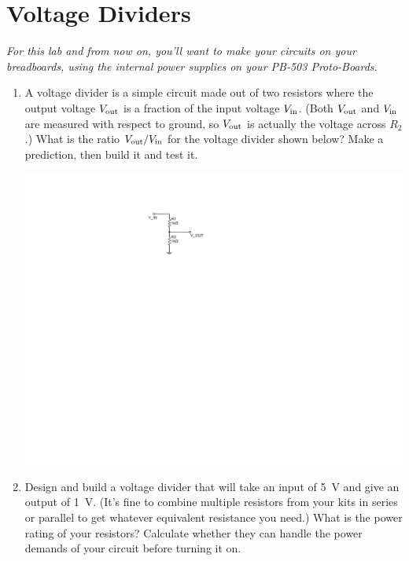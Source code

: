 \section{Voltage Dividers}
\label{lab_voltage_dividers}


\bigskip

\textit{For this lab and from now on, you'll want to make your circuits on your breadboards, using the internal power supplies on your PB-503 Proto-Boards.}

\begin{enumerate}[wide]

\item A voltage divider is a simple circuit made out of two resistors where the output voltage $V_{\rm out}$ is a fraction of the input voltage $V_{\rm in}$.  (Both $V_{\rm out}$ and $V_{\rm in}$ are measured with respect to ground, so $V_{\rm out}$ is actually the voltage across $R_2$.)  What is the ratio $V_{\rm out}/V_{\rm in}$ for the voltage divider shown below?  Make a prediction, then build it and test it.
 
\begin{center}
\includegraphics{voltage_dividers/voltage_divider.pdf}
\end{center}

\item Design and build a voltage divider that will take an input of 5~V and give an output of 1~V.  (It's fine to combine multiple resistors from your kits in series or parallel to get whatever equivalent resistance you need.)  What is the power rating of your resistors?  Calculate whether they can handle the power demands of your circuit before turning it on. \label{part_five_to_one}


\end{enumerate}
